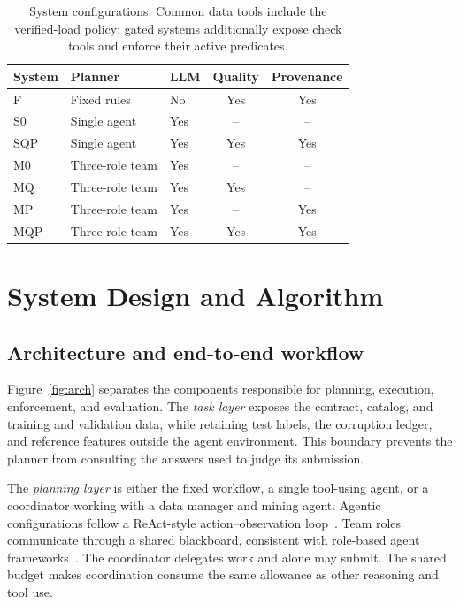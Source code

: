 \documentclass[conference]{IEEEtran}
\newcommand{\sys}[1]{\textsf{#1}}
\begin{document}
\begin{table}[t]
\caption{System configurations. Common data tools include the verified-load policy; gated systems additionally expose check tools and enforce their active predicates.}
\label{tab:systems}
\centering\footnotesize\setlength{\tabcolsep}{5pt}
\begin{tabular}{@{}lllcc@{}}
\toprule
System & Planner & LLM & Quality & Provenance \\
\midrule
\sys{F} & Fixed rules & No & Yes & Yes \\
\sys{S0} & Single agent & Yes & -- & -- \\
\sys{SQP} & Single agent & Yes & Yes & Yes \\
\sys{M0} & Three-role team & Yes & -- & -- \\
\sys{MQ} & Three-role team & Yes & Yes & -- \\
\sys{MP} & Three-role team & Yes & -- & Yes \\
\sys{MQP} & Three-role team & Yes & Yes & Yes \\
\bottomrule
\end{tabular}
\end{table}

\section{System Design and Algorithm}
\label{sec:architecture}
\subsection{Architecture and end-to-end workflow}
Figure~\ref{fig:arch} separates the components responsible for planning, execution, enforcement, and evaluation. The \emph{task layer} exposes the contract, catalog, and training and validation data, while retaining test labels, the corruption ledger, and reference features outside the agent environment. This boundary prevents the planner from consulting the answers used to judge its submission.

The \emph{planning layer} is either the fixed workflow, a single tool-using agent, or a coordinator working with a data manager and mining agent. Agentic configurations follow a ReAct-style action--observation loop~\cite{yao2023react}. Team roles communicate through a shared blackboard, consistent with role-based agent frameworks~\cite{wu2023autogen,hong2024metagpt}. The coordinator delegates work and alone may submit. The shared budget makes coordination consume the same allowance as other reasoning and tool use.
\end{document}
